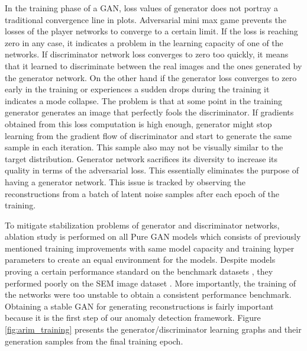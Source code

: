 In the training phase of a GAN, loss values of generator does not
portray a traditional convergence line in plots. Adversarial mini max game prevents the losses of the
player networks to converge to a certain limit. If the loss is reaching zero in any case, it
indicates a problem in the learning capacity of one of the networks. If discriminator network loss converges
to zero too quickly, it means that it learned to discriminate between the real images and the ones
generated by the generator network. On the other hand if the generator loss converges to zero early
in the training or experiences a sudden drops during the training it indicates a mode collapse. 
The problem is that at some point in the training generator generates an image that
perfectly fools the discriminator. If gradients obtained from this loss computation is high enough,
generator might stop learning from the gradient flow of discriminator and start to generate the same
sample in each iteration. This sample also may not be visually similar to the target distribution. Generator network 
sacrifices its diversity to increase its quality in terms of the adversarial loss.  
This essentially eliminates the purpose of having a generator network. This issue is 
tracked by observing the reconstructions from a batch of latent noise samples after each epoch of the 
training. 

To mitigate stabilization problems of generator and discriminator networks, ablation study is 
performed on all Pure GAN models which consists of previously mentioned training improvements with 
same model capacity and training hyper parameters to create an equal environment for the models. 
Despite models proving a certain performance standard on the benchmark datasets \cite{cifar10,Netzer2011ReadingDI}, 
they performed poorly on the SEM image dataset \cite{sem}. More importantly, the training of 
the networks were too unstable to obtain a consistent performance benchmark. Obtaining a stable 
GAN for generating reconstructions is fairly important because it is the first step of our anomaly 
detection framework. Figure \ref{fig:arim_training} presents the generator/discriminator learning 
graphs and their generation samples from the final training epoch.

